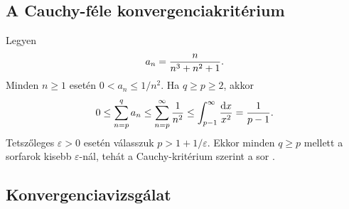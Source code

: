 \documentclass{szb-solution}
\begin{document}
\subsection{A Cauchy-féle konvergenciakritérium}

Legyen
$$
  a_n=\frac{n}{n^3+n^2+1}
  \text.
$$
Minden $n\geq1$ esetén $0<a_n\leq1/n^2$. Ha $q\geq p\geq2$, akkor
$$
  0\leq\sum_{n=p}^{q}a_n
  \leq\sum_{n=p}^{\infty}\frac1{n^2}
  \leq\int_{p-1}^{\infty}\frac{\mathop{}\!\mathrm{d} x}{x^2}
  =\frac1{p-1}
  \text.
$$
Tetszőleges $\varepsilon>0$ esetén válasszuk
$p>1+1/\varepsilon$. Ekkor minden $q\geq p$ mellett a sorfarok kisebb
$\varepsilon$-nál, tehát a Cauchy-kritérium szerint a sor
.

\subsection{Konvergenciavizsgálat}
\end{document}
